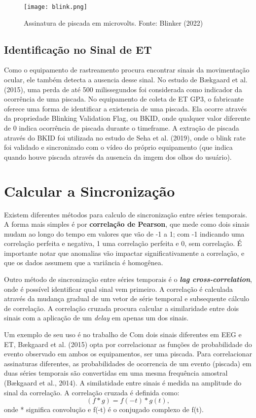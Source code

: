 \begin{figure}[!h]
    \centering
    \texttt{[image: blink.png]}
    \caption{Assinatura de piscada em microvolts. Fonte: Blinker (2022)}
\end{figure}
 


\subsection{Identificação no Sinal de ET}
Como o equipamento de rastreamento procura encontrar sinais da movimentação ocular, ele também detecta a ausencia desse sinal. No estudo 
de Bækgaard et al. (2015), uma perda de até 500 milissegundos foi considerada como indicador da ocorrência de uma piscada. No equipamento de coleta de ET GP3, 
o fabricante oferece uma forma de identificar a existencia de uma piscada. Ela ocorre através da propriedade Blinking Validation Flag, ou BKID, onde qualquer 
valor diferente de 0 indica ocorrência de piscada durante o timeframe. A extração de piscada através do BKID foi utilizada no estudo de Seha et al. (2019), 
onde o blink rate foi validado e sincronizado com o vídeo do próprio equipamento (que indica quando houve piscada através da ausencia da imgem dos olhos do usuário).



\section{Calcular a Sincronização}
Existem diferentes métodos para calculo de sincronização entre séries temporais. 
A forma mais simples é por \textbf{correlação de Pearson}, que mede como dois sinais mudam ao longo do tempo em valores que vão de -1 a 1;
com -1 indicando uma correlação perfeita e negativa, 1 uma correlação perfeita e 0, sem correlação. 
É importante notar que anomalias vão impactar significativamente a correlação, e que os dados assumem que a variância é homogênea. 

Outro método de sincronização entre séries temporais é o \textit{\textbf{lag cross-correlation}}, onde é possível identificar
qual sinal vem primeiro. A correlação é calculada através da mudança gradual de um vetor de série temporal e subsequente cálculo 
de correlação. A correlação cruzada procura calcular a similaridade entre dois sinais com a aplicação de um \textit{delay} em apenas um dos sinais.

Um exemplo de seu uso é no trabalho de Com dois sinais diferentes em EEG e ET, Bækgaard et al. (2015) opta por correlacionar as funções de probabilidade do evento observado em 
ambos os equipamentos, ser uma piscada. 
Para correlacionar assinaturas diferentes, as probabilidades de ocorrencia de um evento (piscada) em duas séries temporais são convertidas em uma mesma frequência amostral (Bækgaard et al., 2014).
A similatidade entre sinais é medida na amplitude do sinal da correlação. A correlação cruzada é definida como:
\begin{equation}\label{eq:correlação cruzada}
    (f * g) = f(-t)*g(t), 
    \end{equation}
onde * significa convolução e f(-t) é o conjugado complexo de f(t).

